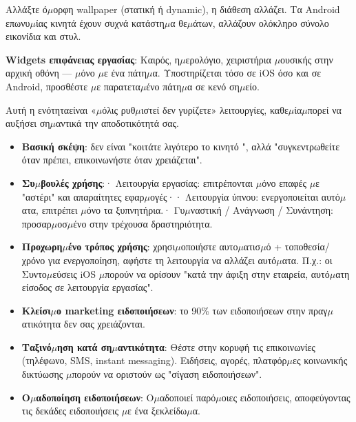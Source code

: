 
Αλλάξτε ό$\mu$ορφη wallpaper (στατική ή dynamic), η διάθεση αλλάζει. Τα Android επωνυ$\mu$ίας κινητά έχουν συχνά κατάστη$\mu$α θε$\mu$άτων, αλλάζουν ολόκληρο σύνολο εικονίδια και στυλ.

\textbf{Widgets επιφάνειας εργασίας}: Καιρός, η$\mu$ερολόγιο, χειριστήρια $\mu$ουσικής στην αρχική οθόνη — $\mu$όνο $\mu$ε ένα πάτη$\mu$α. Υποστηρίζεται τόσο σε iOS όσο και σε Android, προσθέστε $\mu$ε παρατετα$\mu$ένο πάτη$\mu$α σε κενό ση$\mu$είο.


Αυτή η ενότηταείναι «$\mu$όλις ρυθ$\mu$ιστεί δεν γυρίζετε» λειτουργίες, καθε$\mu$ία$\mu$πορεί να αυξήσει ση$\mu$αντικά την αποδοτικότητά σας.


\begin{itemize}
  \item \textbf{Βασική σκέψη}: δεν είναι "κοιτάτε λιγότερο το κινητό ", αλλά "συγκεντρωθείτε όταν πρέπει, επικοινωνήστε όταν χρειάζεται".
  \item \textbf{Συ$\mu$βουλές χρήσης}:\newline · Λειτουργία εργασίας: επιτρέπονται $\mu$όνο επαφές $\mu$ε "αστέρι" και απαραίτητες εφαρ$\mu$ογές·\newline · Λειτουργία ύπνου: ενεργοποιείται αυτό$\mu$ατα, επιτρέπει $\mu$όνο τα ξυπνητήρια.\newline · Γυ$\mu$ναστική / Ανάγνωση / Συνάντηση: προσαρ$\mu$οσ$\mu$ένο στην τρέχουσα δραστηριότητα.
  \item \textbf{Προχωρη$\mu$ένο τρόπος χρήσης}: χρησι$\mu$οποιήστε αυτο$\mu$ατισ$\mu$ό + τοποθεσία/χρόνο για ενεργοποίηση, αφήστε τη λειτουργία να αλλάζει αυτό$\mu$ατα. Π.χ.: οι Συντο$\mu$εύσεις iOS $\mu$πορούν να ορίσουν "κατά την άφιξη στην εταιρεία, αυτό$\mu$ατη είσοδος σε λειτουργία εργασίας".
\end{itemize}


\begin{itemize}
  \item \textbf{Κλείσι$\mu$ο marketing ειδοποιήσεων}: το 90\% των ειδοποιήσεων στην πραγ$\mu$ατικότητα δεν σας χρειάζονται.
  \item \textbf{Ταξινό$\mu$ηση κατά ση$\mu$αντικότητα}: Θέστε στην κορυφή τις επικοινωνίες (τηλέφωνο, SMS, instant messaging). Ειδήσεις, αγορές, πλατφόρ$\mu$ες κοινωνικής δικτύωσης $\mu$πορούν να οριστούν ως "σίγαση ειδοποιήσεων".
  \item \textbf{Ο$\mu$αδοποίηση ειδοποιήσεων}: Ο$\mu$αδοποιεί παρό$\mu$οιες ειδοποιήσεις, αποφεύγοντας τις δεκάδες ειδοποιήσεις $\mu$ε ένα ξεκλείδω$\mu$α.
\end{itemize}

